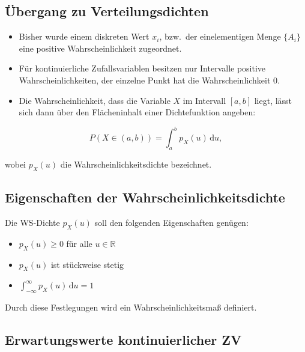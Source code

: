 
\subsection{Übergang zu Verteilungsdichten}
\label{sec:verteilungsdichten}

\begin{itemize}
  \item Bisher wurde einem diskreten Wert $x_i$, bzw.\ der einelementigen Menge $\{A_i\}$ eine positive Wahrscheinlichkeit zugeordnet.
  \item Für kontinuierliche Zufallsvariablen besitzen nur Intervalle positive Wahrscheinlichkeiten, der einzelne Punkt hat die Wahrscheinlichkeit 0.
  \item Die Wahrscheinlichkeit, dass die Variable $X$ im Intervall $[a,b]$ liegt, lässt sich dann über den Flächeninhalt einer Dichtefunktion angeben:
\end{itemize}

$$
P(X \in (a,b)) = \int_a^b p_X(u)\,\mathrm{d}u,
$$

wobei $p_X(u)$ die Wahrscheinlichkeitsdichte bezeichnet.

\subsection{Eigenschaften der Wahrscheinlichkeitsdichte}
\label{sec:ws-dichte-eigenschaften}

\begin{definition}[Wahrscheinlichkeitsdichte]
Die WS-Dichte $p_X(u)$ soll den folgenden Eigenschaften genügen:

\begin{itemize}
  \item $p_X(u) \geq 0$ für alle $u \in \mathbb{R}$
  \item $p_X(u)$ ist stückweise stetig
  \item $\displaystyle\int_{-\infty}^{\infty} p_X(u)\,\mathrm{d}u = 1$
\end{itemize}

Durch diese Festlegungen wird ein Wahrscheinlichkeitsmaß definiert.
\end{definition}

\subsection{Erwartungswerte kontinuierlicher ZV}
\label{sec:erwartungswert-kontinuierlich}

